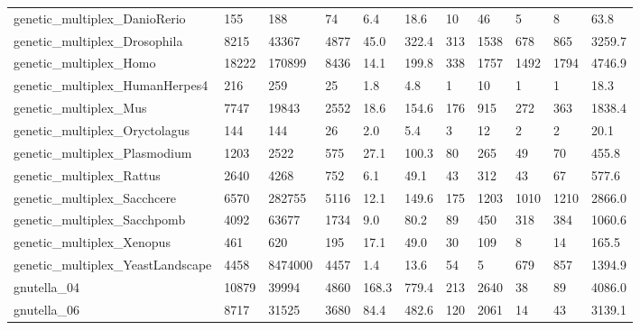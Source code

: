 \begin{longtable}{lllllllllll}
 genetic\_multiplex\_DanioRerio                       & 155        & 188       & 74    & 6.4    & 18.6   & 10    & 46     & 5      & 8      & 63.8    \\
 genetic\_multiplex\_Drosophila                       & 8215       & 43367     & 4877  & 45.0   & 322.4  & 313   & 1538   & 678    & 865    & 3259.7  \\
 genetic\_multiplex\_Homo                             & 18222      & 170899    & 8436  & 14.1   & 199.8  & 338   & 1757   & 1492   & 1794   & 4746.9  \\
 genetic\_multiplex\_HumanHerpes4                     & 216        & 259       & 25    & 1.8    & 4.8    & 1     & 10     & 1      & 1      & 18.3    \\
 genetic\_multiplex\_Mus                              & 7747       & 19843     & 2552  & 18.6   & 154.6  & 176   & 915    & 272    & 363    & 1838.4  \\
 genetic\_multiplex\_Oryctolagus                      & 144        & 144       & 26    & 2.0    & 5.4    & 3     & 12     & 2      & 2      & 20.1    \\
 genetic\_multiplex\_Plasmodium                       & 1203       & 2522      & 575   & 27.1   & 100.3  & 80    & 265    & 49     & 70     & 455.8   \\
 genetic\_multiplex\_Rattus                           & 2640       & 4268      & 752   & 6.1    & 49.1   & 43    & 312    & 43     & 67     & 577.6   \\
 genetic\_multiplex\_Sacchcere                        & 6570       & 282755    & 5116  & 12.1   & 149.6  & 175   & 1203   & 1010   & 1210   & 2866.0  \\
 genetic\_multiplex\_Sacchpomb                        & 4092       & 63677     & 1734  & 9.0    & 80.2   & 89    & 450    & 318    & 384    & 1060.6  \\
 genetic\_multiplex\_Xenopus                          & 461        & 620       & 195   & 17.1   & 49.0   & 30    & 109    & 8      & 14     & 165.5   \\
 genetic\_multiplex\_YeastLandscape                   & 4458       & 8474000   & 4457  & 1.4    & 13.6   & 54    & 5      & 679    & 857    & 1394.9  \\
 gnutella\_04                                        & 10879      & 39994     & 4860  & 168.3  & 779.4  & 213   & 2640   & 38     & 89     & 4086.0  \\
 gnutella\_06                                        & 8717       & 31525     & 3680  & 84.4   & 482.6  & 120   & 2061   & 14     & 43     & 3139.1  \\

\end{longtable}
